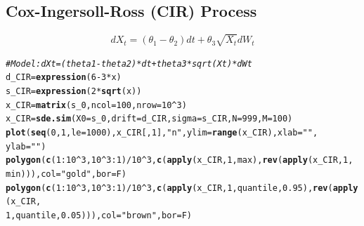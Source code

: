 \documentclass[10pt]{article}\usepackage[]{graphicx}\usepackage[]{color}
\makeatletter
\newcommand{\hlnum}[1]{\textcolor[rgb]{0.686,0.059,0.569}{#1}}%
\newcommand{\hlstr}[1]{\textcolor[rgb]{0.192,0.494,0.8}{#1}}%
\newcommand{\hlcom}[1]{\textcolor[rgb]{0.678,0.584,0.686}{\textit{#1}}}%
\newcommand{\hlopt}[1]{\textcolor[rgb]{0,0,0}{#1}}%
\newcommand{\hlstd}[1]{\textcolor[rgb]{0.345,0.345,0.345}{#1}}%
\newcommand{\hlkwb}[1]{\textcolor[rgb]{0.69,0.353,0.396}{#1}}%
\newcommand{\hlkwc}[1]{\textcolor[rgb]{0.333,0.667,0.333}{#1}}%
\newcommand{\hlkwd}[1]{\textcolor[rgb]{0.737,0.353,0.396}{\textbf{#1}}}%
\newenvironment{kframe}{%
 \def\at@end@of@kframe{}%
 \ifinner\ifhmode%
  \def\at@end@of@kframe{\end{minipage}}%
  \begin{minipage}{\columnwidth}%
 \fi\fi%
 \def\FrameCommand##1{\hskip\@totalleftmargin \hskip-\fboxsep
 \colorbox{shadecolor}{##1}\hskip-\fboxsep
     \hskip-\linewidth \hskip-\@totalleftmargin \hskip\columnwidth}%
 \MakeFramed {\advance\hsize-\width
   \@totalleftmargin\z@ \linewidth\hsize
   \@setminipage}}%
 {\par\unskip\endMakeFramed%
 \at@end@of@kframe}
\newenvironment{knitrout}{}{} %
\makeatother
\begin{document}
\subsection{Cox-Ingersoll-Ross (CIR) Process}  
$$dX_t=(\theta_1-\theta_2) dt+\theta_3 \sqrt{X_t} dW_t$$
\begin{knitrout}
\color{fgcolor}\begin{kframe}
\begin{alltt}
\hlcom{# Model: dXt=(theta1-theta2)*dt+theta3*sqrt(Xt)*dWt}
\hlstd{d_CIR} \hlkwb{=} \hlkwd{expression}\hlstd{(}\hlnum{6} \hlopt{-} \hlnum{3} \hlopt{*} \hlstd{x)}
\hlstd{s_CIR} \hlkwb{=} \hlkwd{expression}\hlstd{(}\hlnum{2} \hlopt{*} \hlkwd{sqrt}\hlstd{(x))}
\hlstd{x_CIR} \hlkwb{=} \hlkwd{matrix}\hlstd{(s_0,} \hlkwc{ncol} \hlstd{=} \hlnum{100}\hlstd{,} \hlkwc{nrow} \hlstd{=} \hlnum{10}\hlopt{^}\hlnum{3}\hlstd{)}
\hlstd{x_CIR} \hlkwb{=} \hlkwd{sde.sim}\hlstd{(}\hlkwc{X0} \hlstd{= s_0,} \hlkwc{drift} \hlstd{= d_CIR,} \hlkwc{sigma} \hlstd{= s_CIR,} \hlkwc{N} \hlstd{=} \hlnum{999}\hlstd{,} \hlkwc{M} \hlstd{=} \hlnum{100}\hlstd{)}
\hlkwd{plot}\hlstd{(}\hlkwd{seq}\hlstd{(}\hlnum{0}\hlstd{,} \hlnum{1}\hlstd{,} \hlkwc{le} \hlstd{=} \hlnum{1000}\hlstd{), x_CIR[,} \hlnum{1}\hlstd{],} \hlstr{"n"}\hlstd{,} \hlkwc{ylim} \hlstd{=} \hlkwd{range}\hlstd{(x_CIR),} \hlkwc{xlab} \hlstd{=} \hlstr{""}\hlstd{,}
    \hlkwc{ylab} \hlstd{=} \hlstr{""}\hlstd{)}
\hlkwd{polygon}\hlstd{(}\hlkwd{c}\hlstd{(}\hlnum{1}\hlopt{:}\hlnum{10}\hlopt{^}\hlnum{3}\hlstd{,} \hlnum{10}\hlopt{^}\hlnum{3}\hlopt{:}\hlnum{1}\hlstd{)}\hlopt{/}\hlnum{10}\hlopt{^}\hlnum{3}\hlstd{,} \hlkwd{c}\hlstd{(}\hlkwd{apply}\hlstd{(x_CIR,} \hlnum{1}\hlstd{, max),} \hlkwd{rev}\hlstd{(}\hlkwd{apply}\hlstd{(x_CIR,} \hlnum{1}\hlstd{,}
    \hlstd{min))),} \hlkwc{col} \hlstd{=} \hlstr{"gold"}\hlstd{,} \hlkwc{bor} \hlstd{= F)}
\hlkwd{polygon}\hlstd{(}\hlkwd{c}\hlstd{(}\hlnum{1}\hlopt{:}\hlnum{10}\hlopt{^}\hlnum{3}\hlstd{,} \hlnum{10}\hlopt{^}\hlnum{3}\hlopt{:}\hlnum{1}\hlstd{)}\hlopt{/}\hlnum{10}\hlopt{^}\hlnum{3}\hlstd{,} \hlkwd{c}\hlstd{(}\hlkwd{apply}\hlstd{(x_CIR,} \hlnum{1}\hlstd{, quantile,} \hlnum{0.95}\hlstd{),} \hlkwd{rev}\hlstd{(}\hlkwd{apply}\hlstd{(x_CIR,}
    \hlnum{1}\hlstd{, quantile,} \hlnum{0.05}\hlstd{))),} \hlkwc{col} \hlstd{=} \hlstr{"brown"}\hlstd{,} \hlkwc{bor} \hlstd{= F)}
\end{alltt}
\end{kframe}


\end{knitrout}
\end{document}
